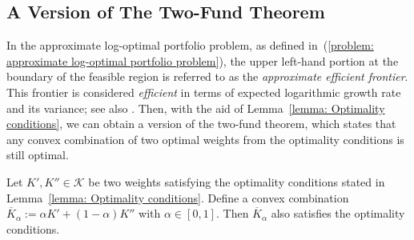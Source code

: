 \documentclass[10pt]{article} %
\begin{document}
	
	
	\subsection{A Version of The Two-Fund Theorem}
	In the approximate log-optimal portfolio problem, as defined in~(\ref{problem: approximate log-optimal portfolio problem}), the upper left-hand portion at the boundary of the feasible region is referred to as the \textit{approximate efficient frontier}.
	This frontier is considered \textit{efficient} in terms of expected logarithmic growth rate and its variance; see also \cite[Chapter 14]{luenberger2013investment}.
	Then, with the aid of Lemma~\ref{lemma: Optimality conditions}, we can obtain a version of the two-fund theorem, which states that any convex combination of two optimal weights from the optimality conditions is still optimal.
	
	
	
	\begin{theoremrep} \label{theorem: two-fund theorem}
		Let $K', K'' \in \mathcal{K}$ be two weights satisfying the optimality conditions stated in Lemma~\ref{lemma: Optimality conditions}. Define a convex combination $\overline{K}_\alpha := \alpha K' + (1-\alpha)K''$ with $\alpha \in [0,1]$.  
		Then $\overline{K}_\alpha$ also satisfies the optimality conditions.
	\end{theoremrep}
	
\end{document}
